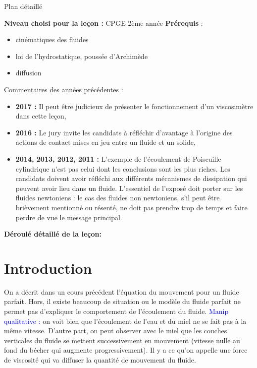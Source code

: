 \begin{reportBlock}{Plan détaillé}

  \textbf{Niveau choisi pour la leçon :} CPGE 2ème année
  \newline
  \textbf{Prérequis} : \begin{itemize}
  \item cinématiques des fluides
      \item loi de l'hydrostatique, poussée d'Archimède
      \item diffusion
  \end{itemize}

  \begin{reportBlock}{Commentaires des années précédentes :}
    \begin{itemize}
        \item \textbf{2017 :} Il peut être judicieux de présenter le fonctionnement d’un viscosimètre dans cette leçon,
        \item \textbf{2016 :} Le jury invite les candidats à réfléchir d’avantage à l’origine des actions de contact mises en jeu entre un fluide et un solide,
        \item \textbf{2014, 2013, 2012, 2011 :} L’exemple de l’écoulement de Poiseuille cylindrique n’est pas celui dont les conclusions sont les plus riches. Les candidats doivent avoir réfléchi aux différents mécanismes de dissipation qui peuvent avoir lieu dans un fluide. L’essentiel de l’exposé doit porter sur les fluides newtoniens : le cas des fluides non newtoniens, s’il peut être brièvement mentionné ou résenté, ne doit pas prendre trop de temps et faire perdre de vue le message principal.
    \end{itemize}
\end{reportBlock}

  \textbf{Déroulé détaillé de la leçon: }  
  
  \section*{Introduction}
  On a décrit dans un cours précédent l'équation du mouvement pour un fluide parfait. Hors, il existe beaucoup de situation ou le modèle du fluide parfait ne permet pas d'expliquer le comportement de l'écoulement du fluide. \textcolor{blue}{Manip qualitative :} on voit bien que l'écoulement de l'eau et du miel ne se fait pas à la même vitesse. D'autre part, on peut observer avec le miel que les couches verticales du fluide se mettent successivement en mouvement (vitesse nulle au fond du bécher qui augmente progressivement). Il y a ce qu'on appelle une force de viscosité qui va diffuser la quantité de mouvement du fluide.


\end{reportBlock}
